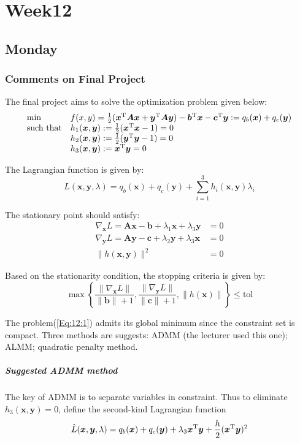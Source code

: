 
\chapter{Week12}

\section{Monday}
\subsection{Comments on Final Project}

The final project aims to solve the optimization problem given below:
\begin{equation}\label{Eq:12:1}
\begin{array}{ll}
\min&f(x,y)=\frac{1}{2}(\bm x\trans\bm A\bm x+\bm y\trans\bm A\bm y) - \bm b\trans\bm x-\bm c\trans\bm y:=q_b(\bm x)+q_c(\bm y)\\
\mbox{such that}&h_1(\bm x,\bm y):=\frac{1}{2}(\bm x\trans\bm x-1)=0\\
&h_2(\bm x,\bm y):=\frac{1}{2}(\bm y\trans\bm y-1)=0\\
&h_3(\bm x,\bm y):=\bm x\trans\bm y=0
\end{array}
\end{equation}

The Lagrangian function is given by:
\begin{equation}
L(\bm x,\bm y,\lambda)=q_b(\bm x)+q_c(\bm y)+\sum_{i=1}^3h_i(\bm x,\bm y)\lambda_i
\end{equation}

The stationary point should satisfy:
\begin{align*}
\nabla_{\bm x}L=
\bm{Ax}-\bm b+\lambda_1\bm x+\lambda_3\bm y&=0\\
\nabla_{\bm y}L=
\bm{Ay}-\bm c+\lambda_2\bm y+\lambda_3\bm x&=0\\
\|h(\bm x,\bm y)\|^2&=0
\end{align*}

Based on the stationarity condition, the stopping criteria is given by:
\[
\max\left\{
\frac{\|\nabla_{\bm x}L\|}{\|\bm b\|+1},
\frac{\|\nabla_{\bm y}L\|}{\|\bm c\|+1},
\|h(\bm x)\|
\right\}\le\mbox{tol}
\]

The problem(\ref{Eq:12:1}) admits its global minimum since the constraint set is compact. Three methods are suggests: ADMM (the lecturer used this one); ALMM; quadratic penalty method.

\paragraph{Suggested ADMM method}
The key of ADMM is to separate variables in constraint. Thus to eliminate $h_3(\bm x,\bm y)=0$, define the second-kind Lagrangian function
\[
\hat L(\bm x,\bm y,\lambda) = q_b(\bm x)+q_c(\bm y)+\lambda_3\bm x^{\mathrm T}\bm y+\frac{h}{2}(\bm x^{\mathrm T}\bm y)^2
\]

